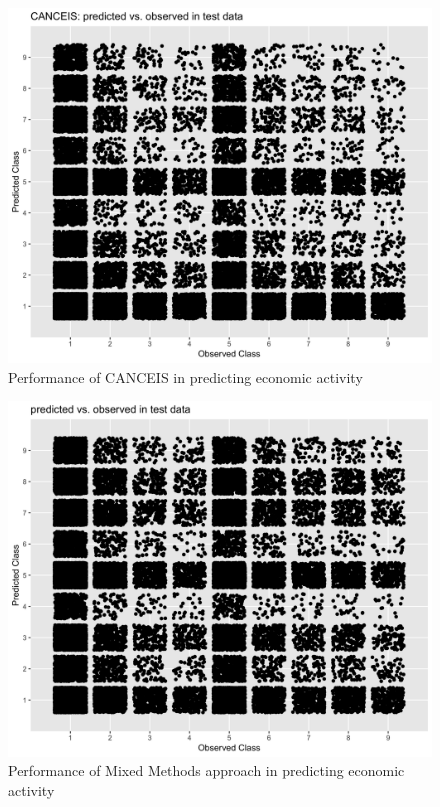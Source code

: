 \documentclass[]{book}
\begin{document}
\begin{figure}
\centering
\includegraphics{images/EACANCEISqplot.png}
\caption{Performance of CANCEIS in predicting economic activity}
\end{figure}

\begin{figure}
\centering
\includegraphics{images/EACANCEISXGqplot.png}
\caption{Performance of Mixed Methods approach in predicting economic
activity}
\end{figure}
\end{document}
